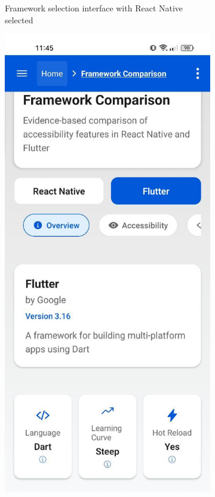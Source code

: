 \begin{figure}[ht]
\begin{subfigure}[b]{0.37\textwidth}
        \caption{Framework selection interface with React Native selected}
        \label{fig:framework-selection-reactnative}
    \end{subfigure}
    \hfill
    \begin{subfigure}[b]{0.37\textwidth}
        \centering
        \includegraphics[width=\linewidth, alt={Framework selection interface showing Flutter details}]{img/overview2.jpg}

\end{subfigure}
\end{figure}
